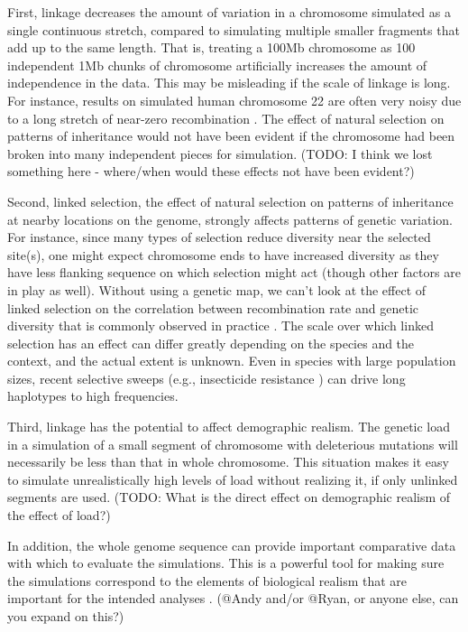 \documentclass[hidelinks]{article}
\begin{document}
First, linkage decreases the amount of variation in a chromosome
simulated as a single continuous stretch, compared to simulating
multiple smaller fragments that add up to the same length. That is,
treating a 100Mb chromosome as 100 independent 1Mb chunks of chromosome
artificially increases the amount of independence in the data. This may
be misleading if the scale of linkage is long. For instance, results on
simulated human chromosome 22 are often very noisy due to a long stretch
of near-zero recombination \citep{Dawson2002}. The effect of natural selection
on patterns of inheritance would not have been evident if the chromosome
had been broken into many independent pieces for simulation. (TODO: I
think we lost something here - where/when would these effects not have
been evident?)

Second, linked selection, the effect of natural selection on
patterns of inheritance at nearby locations on the genome, strongly
affects patterns of genetic variation. For instance, since many types of
selection reduce diversity near the selected site(s), one might expect chromosome ends to
have increased diversity as they have less flanking sequence on which
selection might act (though other factors are in play as well). Without
using a genetic map, we can't look at the effect of linked selection on
the correlation between recombination rate and genetic diversity that is
commonly observed in practice \citep{Begun1992}. The scale over which linked
selection has an effect can differ greatly depending on the
species and the context, and the actual extent is unknown. Even in
species with large population sizes, recent selective sweeps (e.g.,
insecticide resistance \citep{Lynd2010}) can drive long haplotypes to high
frequencies.

Third, linkage has the potential to affect demographic realism. The
genetic load in a simulation of a small segment of chromosome with
deleterious mutations will necessarily be less than that in whole
chromosome. This situation makes it easy to simulate unrealistically
high levels of load without realizing it, if only unlinked segments are used.
(TODO: What is the direct effect on demographic realism of the effect of
load?)

In addition, the whole genome sequence can provide important comparative
data with which to evaluate the simulations. This is a powerful tool for
making sure the simulations correspond to the elements of biological
realism that are important for the intended analyses \citep{Hsieh2016a}. 
(@Andy and/or @Ryan, or anyone else, can you expand on this?)
\end{document}
